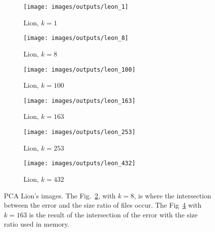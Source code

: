 \documentclass[journal]{IEEEtran}
\begin{document}
\begin{figure}
	\centering
	\begin{subfigure}{0.23\textwidth}
		\centering
		\texttt{[image: images/outputs/leon\_1]} 
		\caption{Lion, $k=1$}
		\label{fig:outputs:lion_1} 
	\end{subfigure}
	\centering
	\begin{subfigure}{0.23\textwidth}
		\centering
		\texttt{[image: images/outputs/leon\_8]} 
		\caption{Lion, $k=8$}
		\label{fig:outputs:lion_8} 
	\end{subfigure}

	\centering
	\begin{subfigure}{0.23\textwidth}
		\centering
		\texttt{[image: images/outputs/leon\_100]} 
		\caption{Lion, $k=100$}
		\label{fig:outputs:lion_100} 
	\end{subfigure}
	\centering
	\begin{subfigure}{0.23\textwidth}
		\centering
		\texttt{[image: images/outputs/leon\_163]} 
		\caption{Lion, $k=163$}
		\label{fig:outputs:lion_163} 
	\end{subfigure}

	\centering
	\begin{subfigure}{0.23\textwidth}
		\centering
		\texttt{[image: images/outputs/leon\_253]} 
		\caption{Lion, $k=253$}
		\label{fig:outputs:lion_253} 
	\end{subfigure}
	\centering
	\begin{subfigure}{0.23\textwidth}
		\centering
		\texttt{[image: images/outputs/leon\_432]} 
		\caption{Lion, $k=432$}
		\label{fig:outputs:lion_432} 
	\end{subfigure}
	
	\caption{PCA Lion's images. The Fig.~\ref{fig:outputs:lion_8}, with $k=8$, is where the intersection between the error and the size ratio of files occur. The Fig~\ref{fig:outputs:lion_163} with $k=163$ is the result of the intersection of the error with the size ratio used in memory.}
	\label{fig:outputs:lion}
\end{figure}
\end{document}
